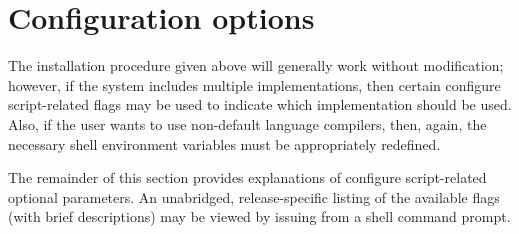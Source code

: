 \section{Configuration options}

The installation procedure given above will generally work without modification; however, if the system 
includes multiple {\mpi} implementations, then certain configure script-related flags may 
be used to indicate which {\mpi} implementation should be used.  Also, if the user wants to 
use non-default language compilers, then, again, the necessary 
shell environment variables must be appropriately redefined.

The remainder of this section provides explanations of configure script-related optional parameters.  
An unabridged, release-specific listing of the available flags (with brief descriptions) may be viewed by 
issuing  from a shell command prompt.



